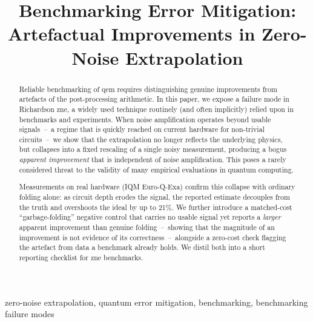 \documentclass[10pt,conference, letterpaper]{IEEEtran}
\begin{document}

\title{Benchmarking Error Mitigation: Artefactual Improvements in Zero-Noise Extrapolation}

\author{
    \and
}

\maketitle
 
\begin{abstract}
Reliable benchmarking of \gls{qem} requires distinguishing genuine improvements from artefacts of the post-processing arithmetic. In this paper, we expose a failure mode in Richardson \gls{zne}, a widely used technique routinely (and often implicitly) relied upon in benchmarks and experiments. When noise amplification operates beyond usable signals~--~a regime that is quickly reached on current hardware for non-trivial circuits~--~we show that the extrapolation no longer reflects the underlying physics, but collapses into a fixed rescaling of a single noisy measurement, producing a bogus \emph{apparent improvement} that is independent of noise amplification. This poses a rarely considered threat to the validity of many empirical evaluations in quantum computing.


Measurements on real hardware (IQM Euro-Q-Exa) confirm this collapse with ordinary folding alone: as circuit depth erodes the signal, the reported estimate decouples from the truth and overshoots the ideal by up to 21\%. We further introduce a matched-cost \enquote{garbage-folding} negative control that carries no usable signal yet reports a \emph{larger} apparent improvement than genuine folding~--~showing that the magnitude of an improvement is not evidence of its correctness~--~alongside a zero-cost check flagging the artefact from data a benchmark already holds. We distil both into a short reporting checklist for \gls{zne} benchmarks.
\end{abstract}
\vspace{-1em}
\begin{IEEEkeywords}
zero-noise extrapolation,
quantum error mitigation, benchmarking,
benchmarking failure modes
\end{IEEEkeywords}
\end{document}

